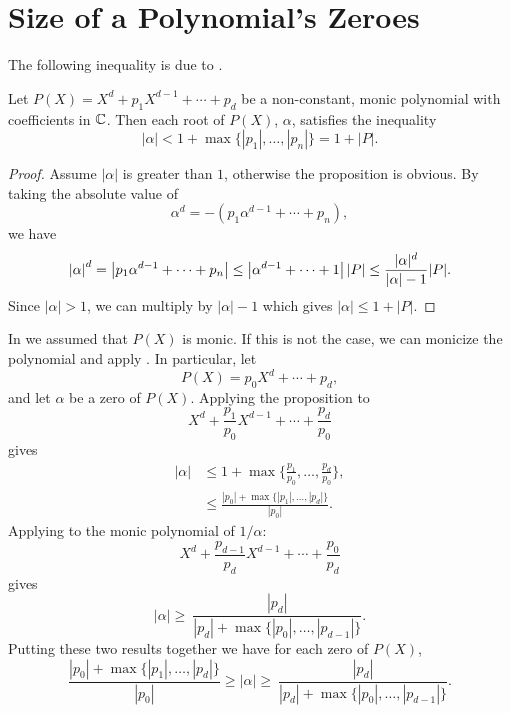 \section{Size of a Polynomial's Zeroes}
\label{PB:RootSize:Sec}

The following inequality is due to {\Cauchy}
\cite{Cauchy1829-wp}.

\begin{proposition}[Cauchy]
\label{Cauchy:Zero:Bound:Prop}
Let $P(X) = X^{d} + p_{1} X^{d-1} + \cdots + p_{d}$ be a non-constant,
monic polynomial with coefficients in $\mathbb{C}$.  Then each root of $P(X)$,
$\alpha$, satisfies the inequality
\begin{equation}
\label{Cauchy:Zero:Ineq:Eq}
\left|\alpha\right| < 1 + \max \{|p_{1}|, \ldots, |p_{n}|\} 
  = 1 + \left| P \right|.
\end{equation}
\end{proposition}

\begin{proof}
Assume $|\alpha|$ is greater than $1$, otherwise the proposition is obvious.
By taking the absolute value of 
\[
\alpha^d = -(p_{1} \alpha^{d-1} + \cdots + p_{n}),
\]
we have
\[
\left| \alpha \right|^{d} = \left| p_{1} \alpha^{d-1} + \cdots + p_{n} \right|
 \le \left| \alpha^{d-1} + \cdots + 1 \right| |P| 
 \le { |\alpha|^{d} \over |\alpha| - 1} |P|.
\]
Since $|\alpha| > 1$, we can multiply by $|\alpha| - 1$ which gives 
$|\alpha| \le 1 + |P|$. 
\end{proof}

In  we assumed that $P(X)$ is monic.  If this is not the case, we
can monicize the polynomial and apply .  In
particular, let 
\[
P(X) = p_{0} X^{d} + \cdots + p_{d},
\]
and let $\alpha$ be a zero of $P(X)$.  Applying the proposition to
\[
X^{d} + \frac{p_{1}}{p_{0}}X^{d-1} + \cdots + \frac{p_{d}}{p_{0}}
\]
gives
\[
\begin{aligned}
|\alpha| & 
   \le 1 + \max\{ \frac{p_{1}}{p_{0}}, \ldots, \frac{p_{d}}{p_{0}} \},\\
 & \le \frac{\left|p_{0}\right| + 
               \max \{\left|p_{1}\right|, \ldots, \left|p_{d}\right|
\}}{\left|p_{0}\right|}.
\end{aligned}
\]
Applying  to the monic polynomial of
$1/\alpha$:
\[
X^{d} + \frac{p_{d-1}}{p_{d}} X^{d-1} + \cdots + \frac{p_{0}}{p_{d}}
\]
gives
\[
|\alpha| \ge \ \frac{\left|p_{d}\right|}{\left|p_{d}\right| + 
   \max\{ \left|p_{0}\right|, \ldots, \left|p_{d-1}\right|\}}.
\]
Putting these two results together we have for each zero of $P(X)$,
\[
\frac{\left|p_{0}\right| + 
               \max \{\left|p_{1}\right|, \ldots, \left|p_{d}\right|
\}}{\left|p_{0}\right|}
\ge
|\alpha| \ge \ \frac{\left|p_{d}\right|}{\left|p_{d}\right| + 
   \max\{ \left|p_{0}\right|, \ldots, \left|p_{d-1}\right|\}}.
\]

